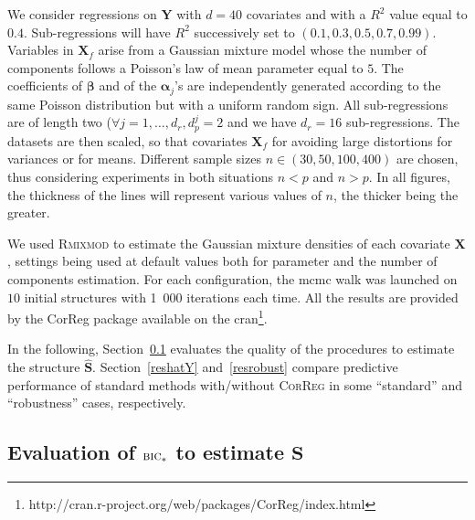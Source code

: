 \documentclass[11pt,a4paper]{article}
\begin{document}
We consider regressions on $\boldsymbol{Y}$ with $d=40$ covariates and with a $R^2$ value equal to $0.4$. Sub-regressions will have $R^2$ successively set to $(0.1,0.3,0.5,0.7,0.99)$. Variables in $\boldsymbol{X}_f$ arise from a Gaussian mixture model whose the number of components follows a Poisson's law of mean parameter equal to $5$. The coefficients of $\boldsymbol{\beta}$ and of the $\boldsymbol{\alpha}_j$'s are independently generated according to the same Poisson distribution but with a uniform random sign. All sub-regressions are of length two ($\forall j=1,\ldots,d_r, d_p^j=2$ and we have $d_r=16$ sub-regressions. The datasets are then scaled, so that covariates $\boldsymbol{X}_f$ for avoiding large distortions for variances or for means.	Different sample sizes  $n\in (30,50,100,400)$ are chosen, thus considering experiments in both situations $n<p$ and $n>p$. In all figures, the thickness of the lines will represent various values of $n$, the thicker being the greater.

We used \textsc{Rmixmod} \cite{remi:hal-00919486} to estimate the Gaussian mixture densities of each covariate $\boldsymbol{X}$, settings being used at default values both for parameter and the number of components estimation. For each configuration, the {\sc mcmc} walk was launched on $10$ initial structures with 1~000 iterations each time. All the results are provided by the {\sc CorReg} package available on the {\sc cran}\footnote{http://cran.r-project.org/web/packages/CorReg/index.html}.

\vspace{3mm}	

In the following, Section~\ref{sec:simS} evaluates the quality of the  procedures to estimate the structure $\hat{\boldsymbol{S}}$. Section~\ref{reshatY} and~\ref{resrobust} compare predictive performance of standard methods with/without \textsc{CorReg} in some ``standard'' and ``robustness'' cases, respectively. 
	

	
		
	
		\subsection{Evaluation of $\mbox{\sc bic}_*$ to estimate $\boldsymbol{S}$}\label{sec:simS}
\end{document}
